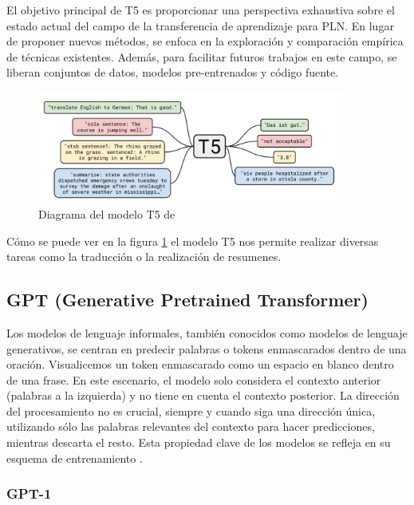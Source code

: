 El objetivo principal de T5 es proporcionar una perspectiva exhaustiva sobre el estado actual del campo de la transferencia de aprendizaje para PLN. En lugar de proponer nuevos métodos, se enfoca en la exploración y comparación empírica de técnicas existentes. Además, para facilitar futuros trabajos en este campo, se liberan conjuntos de datos, modelos pre-entrenados y código fuente.

\begin{figure}[h]
	\centering
	\includegraphics[width=0.9\textwidth]{Imagenes/T5}
	\caption{Diagrama del modelo T5 de \cite{T5}}
	\label{fig:3.2}
\end{figure}

Cómo se puede ver en la figura \ref{fig:3.2} el modelo T5 nos permite realizar diversas tareas como la traducción o la realización de resumenes.

\subsection{GPT (Generative Pretrained Transformer)}

Los modelos de lenguaje informales, también conocidos como modelos de lenguaje generativos, se centran en predecir palabras o tokens enmascarados dentro de una oración. Visualicemos un token enmascarado como un espacio en blanco dentro de una frase. En este escenario, el modelo solo considera el contexto anterior (palabras a la izquierda) y no tiene en cuenta el contexto posterior. La dirección del procesamiento no es crucial, siempre y cuando siga una dirección única, utilizando sólo las palabras relevantes del contexto para hacer predicciones, mientras descarta el resto. Esta propiedad clave de los modelos se refleja en su esquema de entrenamiento \citep{rothman2022}.

\subsubsection{GPT-1}

